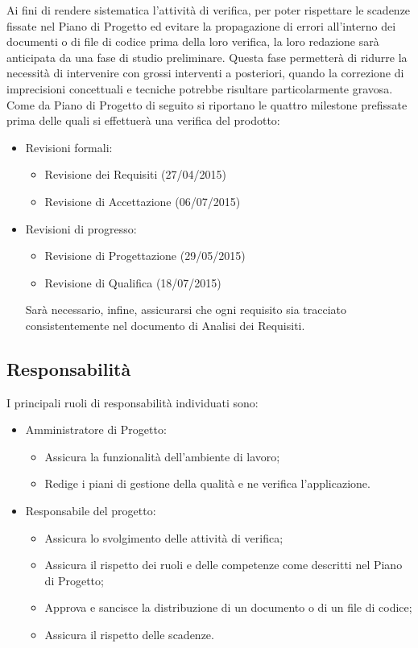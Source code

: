 Ai fini di rendere sistematica l'attività di verifica, per poter rispettare le scadenze fissate nel Piano di Progetto ed evitare la propagazione di errori all'interno dei documenti o di file di codice prima della loro verifica, la loro redazione sarà anticipata da una fase di studio preliminare.
Questa fase permetterà di ridurre la necessità di intervenire con grossi interventi a posteriori, quando la correzione di imprecisioni concettuali e tecniche potrebbe risultare particolarmente gravosa.
Come da Piano di Progetto di seguito si riportano le quattro milestone prefissate prima delle quali si effettuerà una verifica del prodotto:
\begin{itemize}

\item Revisioni formali:
\begin{itemize}
\item Revisione dei Requisiti (27/04/2015)
\item Revisione di Accettazione (06/07/2015)
\end{itemize}

\item Revisioni di progresso:
\begin{itemize}
\item Revisione di Progettazione (29/05/2015)
\item Revisione di Qualifica (18/07/2015)
\end{itemize}
Sarà necessario, infine, assicurarsi che ogni requisito sia tracciato consistentemente nel documento di Analisi dei Requisiti.
\end{itemize}
\subsection{Responsabilità}

I principali ruoli di responsabilità individuati sono:
\begin{itemize}
\item Amministratore di Progetto:
\begin{itemize}
\item Assicura la funzionalità dell'ambiente di lavoro;
\item Redige i piani di gestione della qualità e ne verifica l'applicazione.
\end{itemize}

\item Responsabile del progetto:
\begin{itemize}
\item Assicura lo svolgimento delle attività di verifica;
\item Assicura il rispetto dei ruoli e delle competenze come descritti nel Piano di Progetto;
\item Approva e sancisce la distribuzione di un documento o di un file di codice;
\item Assicura il rispetto delle scadenze.
\end{itemize}
\end{itemize}


